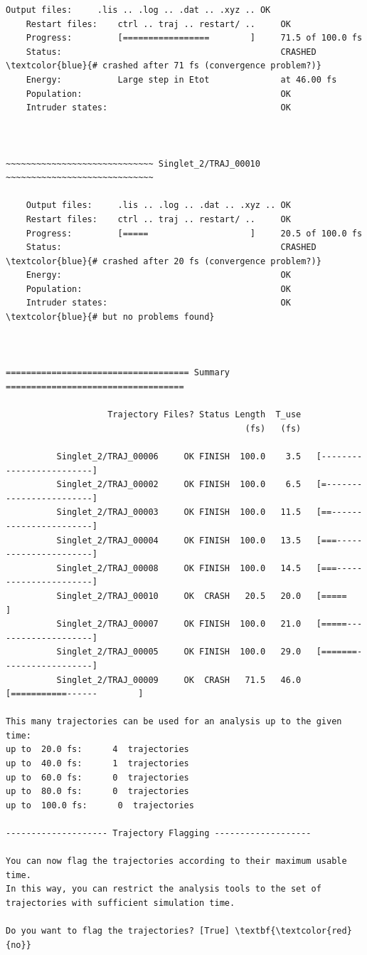 \documentclass[a4paper,11pt,DIV=15,openany]{scrbook}
\begin{document}
\begin{oframed}
\begin{Verbatim}[commandchars=\\\{\}]
    Output files:     .lis .. .log .. .dat .. .xyz .. OK
    Restart files:    ctrl .. traj .. restart/ ..     OK
    Progress:         [=================        ]     71.5 of 100.0 fs
    Status:                                           CRASHED   \textcolor{blue}{# crashed after 71 fs (convergence problem?)}
    Energy:           Large step in Etot              at 46.00 fs
    Population:                                       OK
    Intruder states:                                  OK



~~~~~~~~~~~~~~~~~~~~~~~~~~~~~ Singlet_2/TRAJ_00010 ~~~~~~~~~~~~~~~~~~~~~~~~~~~~~

    Output files:     .lis .. .log .. .dat .. .xyz .. OK
    Restart files:    ctrl .. traj .. restart/ ..     OK
    Progress:         [=====                    ]     20.5 of 100.0 fs
    Status:                                           CRASHED   \textcolor{blue}{# crashed after 20 fs (convergence problem?)}
    Energy:                                           OK
    Population:                                       OK
    Intruder states:                                  OK   \textcolor{blue}{# but no problems found}



==================================== Summary ===================================

                    Trajectory Files? Status Length  T_use
                                               (fs)   (fs)

          Singlet_2/TRAJ_00006     OK FINISH  100.0    3.5   [-------------------------]
          Singlet_2/TRAJ_00002     OK FINISH  100.0    6.5   [=------------------------]
          Singlet_2/TRAJ_00003     OK FINISH  100.0   11.5   [==-----------------------]
          Singlet_2/TRAJ_00004     OK FINISH  100.0   13.5   [===----------------------]
          Singlet_2/TRAJ_00008     OK FINISH  100.0   14.5   [===----------------------]
          Singlet_2/TRAJ_00010     OK  CRASH   20.5   20.0   [=====                    ]
          Singlet_2/TRAJ_00007     OK FINISH  100.0   21.0   [=====--------------------]
          Singlet_2/TRAJ_00005     OK FINISH  100.0   29.0   [=======------------------]
          Singlet_2/TRAJ_00009     OK  CRASH   71.5   46.0   [===========------        ]

This many trajectories can be used for an analysis up to the given time:
up to  20.0 fs:      4  trajectories
up to  40.0 fs:      1  trajectories
up to  60.0 fs:      0  trajectories
up to  80.0 fs:      0  trajectories
up to  100.0 fs:      0  trajectories

-------------------- Trajectory Flagging -------------------

You can now flag the trajectories according to their maximum usable time.
In this way, you can restrict the analysis tools to the set of trajectories with sufficient simulation time.

Do you want to flag the trajectories? [True] \textbf{\textcolor{red}{no}}

\end{Verbatim}
\end{oframed}
\end{document}
